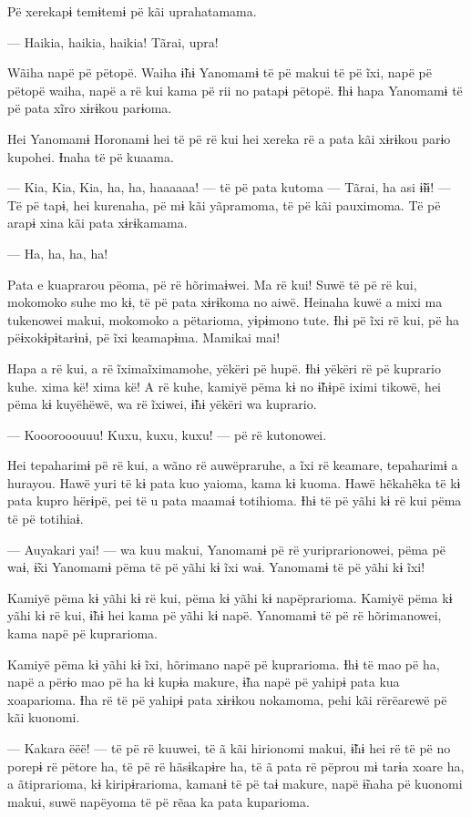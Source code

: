 Pë xerekapɨ temɨtemɨ pë kãi uprahatamama. 

— Haikia, haikia, haikia! Tãrai, upra! 

Wãiha napë pë pëtopë. Waiha ɨ̃hɨ Yanomamɨ të pë makui të pë ĩxi, napë pë
pëtopë waiha, napë a rë kui kama pë rii no patapɨ pëtopë. Ɨhɨ hapa
Yanomamɨ të pë pata xĩro xɨrɨkou parɨoma. 

Hei Yanomamɨ Horonamɨ hei të pë rë kui hei xereka rë a pata kãi xɨrɨkou
parɨo kupohei. Ɨnaha të pë kuaama. 

— Kia, Kia, Kia, ha, ha, haaaaaa! --- të pë pata kutoma --- Tãrai, ha asi
ɨ̃ɨɨ! --- Të pë tapɨ, hei kurenaha, pë mɨ kãi yãpramoma, të pë kãi
pauximoma. Të pë arapɨ xina kãi pata xɨrɨkamama. 

— Ha, ha, ha, ha! 

Pata e kuaprarou pëoma, pë rë hõrimaɨwei. Ma rë kui! Suwë të pë rë kui,
mokomoko suhe mo kɨ, të pë pata xɨrɨkoma no aiwë. Heinaha kuwë a mixi ma
tukenowei makui, mokomoko a pëtarioma, yɨpɨmono tute. Ɨhɨ pë ĩxi rë kui,
pë ha pëɨxokɨpɨtarɨnɨ, pë ĩxi keamapɨma. Mamikai mai! 

Hapa a rë kui, a rë ĩximaĩximamohe, yëkëri pë hupë. Ɨhɨ yëkëri rë pë
kuprario kuhe. xima kë! xima kë! A rë kuhe, kamiyë pëma kɨ no ɨ̃hɨpë
iximi tikowë, hei pëma kɨ kuyëhëwë, wa rë ĩxiwei, ɨ̃hɨ yëkëri wa
kuprario. 

— Kooorooouuu! Kuxu, kuxu, kuxu! --- pë rë kutonowei. 

Hei tepaharimɨ pë rë kui, a wãno rë auwëpraruhe, a ĩxi rë keamare,
tepaharimɨ a hurayou. Hawë yuri të kɨ pata kuo yaioma, kama kɨ kuoma.
Hawë hẽkahẽka të kɨ pata kupro hërɨpë, pei të u pata maamaɨ totihioma.
Ɨhɨ të pë yãhi kɨ rë kui pëma të pë totihiaɨ. 

— Auyakari yai! --- wa kuu makui, Yanomamɨ pë rë yuriprarionowei, pëma pë
waɨ, ɨ̃xi Yanomamɨ pëma të pë yãhi kɨ ĩxi waɨ. Yanomamɨ të pë yãhi kɨ
ĩxi! 

Kamiyë pëma kɨ yãhi kɨ rë kui, pëma kɨ yãhi kɨ napëprarioma. Kamiyë pëma
kɨ yãhi kɨ rë kui, ɨ̃hɨ hei kama pë yãhi kɨ napë. Yanomamɨ të pë rë
hõrimanowei, kama napë pë kuprarioma. 

Kamiyë pëma kɨ yãhi kɨ ĩxi, hõrimano napë pë kuprarioma. Ɨhɨ të mao pë
ha, napë a përɨo mao pë ha kɨ kupɨa makure, ɨ̃ha napë pë yahipɨ pata kua
xoaparioma. Ɨha rë të pë yahipɨ pata xɨrɨkou nokamoma, pehi kãi
rërëarewë pë kãi kuonomi. 

— Kakara ëëë! --- të pë rë kuuwei, të ã kãi hirionomi makui, ɨ̃hɨ hei rë
të pë no porepɨ rë pëtore ha, të pë rë hãsɨkapɨre ha, të ã pata rë
pëprou mɨ tarɨa xoare ha, a ãtiprarioma, kɨ kiripɨrarioma, kamanɨ të pë
taɨ makure, napë ɨ̃naha pë kuonomi makui, suwë napëyoma të pë rẽaa ka
pata kuparioma. 

